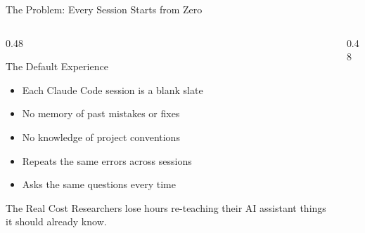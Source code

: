 \documentclass[aspectratio=169,11pt]{beamer}
\begin{document}
\begin{frame}[shrink=5]{The Problem: Every Session Starts from Zero}

\begin{columns}[T]
\begin{column}{0.48\textwidth}

\begin{block}{The Default Experience}
\begin{itemize}
  \item Each Claude Code session is a blank slate
  \item No memory of past mistakes or fixes
  \item No knowledge of project conventions
  \item Repeats the same errors across sessions
  \item Asks the same questions every time
\end{itemize}
\end{block}

\medskip

\begin{alertblock}{The Real Cost}
  Researchers lose hours re-teaching their AI assistant things it should already know.
\end{alertblock}

\end{column}
\begin{column}{0.48\textwidth}

\centering
{}

\end{column}
\end{columns}

\end{frame}
\end{document}
